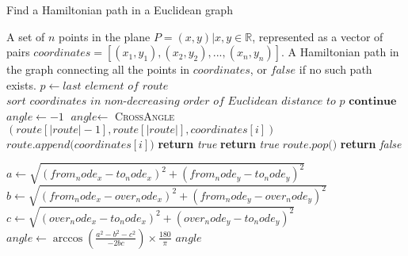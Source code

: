 \documentclass[a4paper,10pt,ngerman]{scrartcl}
\begin{document}
    \begin{algorithm}[H]
        \caption{Find a Hamiltonian path in a Euclidean graph}
        \begin{algorithmic}[1]
            \label{alg:algorithm1}
            \Require A set of $n$ points in the plane $P={(x,y)| x,y \in \mathbb{R}}$, represented as a vector of pairs $\textit{coordinates}=[(x_1,y_1), (x_2,y_2),..., (x_n,y_n)]$.
            \Ensure A Hamiltonian path in the graph connecting all the points in $\textit{coordinates}$, or $\textit{false}$ if no such path exists.
                    \State $p\gets \textit{last element of } \textit{route}$
                    \State $\textit{sort } \textit{coordinates } \textit{in non-decreasing order of Euclidean distance to } p$
                \EndIf
                        \State $\textbf{continue}$
                    \EndIf
                    \State $\textit{angle}\gets -1$
                        \State $\textit{angle}\gets$ \textsc{CrossAngle}$(\textit{route}[|\textit{route}|-1], \textit{route}[|\textit{route}|], \textit{coordinates}[i])$
                    \EndIf
                        \State $\textit{route.append(}\textit{coordinates}[i]\textit{)}$
                            \State \textbf{return} \textit{true}
                        \EndIf
                            \State \textbf{return} \textit{true}
                        \Else
                            \State $\textit{route.pop()}$
                        \EndIf
                    \EndIf
                \EndFor
                \State \textbf{return} \textit{false}
            \EndProcedure
        \end{algorithmic}
        \begin{algorithmic}[2]
            \label{alg:algorithm2}
                \State $\textit{a}\gets \sqrt{(from_node_x - to_node_x)^2 + (from_node_y - to_node_y)^2}$
                \State $\textit{b}\gets \sqrt{(from_node_x - over_node_x)^2 + (from_node_y - over_node_y)^2}$
                \State $\textit{c}\gets \sqrt{(over_node_x - to_node_x)^2 + (over_node_y - to_node_y)^2}$
                \State $\textit{angle} \gets \arccos\left(\frac{a^2 - b^2 - c^2}{-2bc}\right) \times \frac{180}{\pi}$
                \State \Return $angle$
            \EndProcedure
        \end{algorithmic}




\end{algorithm}
\end{document}
